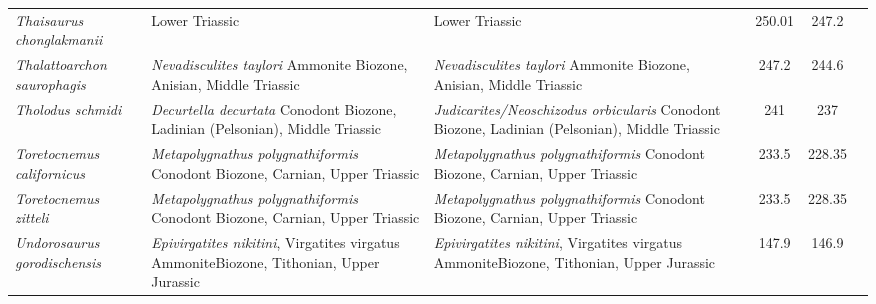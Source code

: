 \begin{longtabu}{>{\itshape}lXXSSl}
	Thaisaurus chonglakmanii                             & Lower Triassic                                                                                                                     & Lower Triassic                                                                                                                     & 250.01                   & 247.2                    & \cite{Mazin1991} \\                      
	Thalattoarchon saurophagis                           & \emph{Nevadisculites taylori} Ammonite Biozone, Anisian, Middle Triassic                                                           & \emph{Nevadisculites taylori} Ammonite Biozone, Anisian, Middle Triassic                                                           & 247.2                    & 244.6                    & \cite{Frobisch2013} \\                   
	Tholodus schmidi                                     & \emph{Decurtella decurtata} Conodont Biozone, Ladinian (Pelsonian), Middle Triassic                                                & \emph{Judicarites/Neoschizodus orbicularis} Conodont Biozone, Ladinian (Pelsonian), Middle Triassic                                & 241                      & 237                      & \cite{DallaVecchia2004} \\               
	Toretocnemus californicus                            & \emph{Metapolygnathus polygnathiformis} Conodont Biozone, Carnian, Upper Triassic                                                  & \emph{Metapolygnathus polygnathiformis} Conodont Biozone, Carnian, Upper Triassic                                                  & 233.5                    & 228.35                   & \cite{Merriam1903,McGowan2003} \\        
	Toretocnemus zitteli                                 & \emph{Metapolygnathus polygnathiformis} Conodont Biozone, Carnian, Upper Triassic                                                  & \emph{Metapolygnathus polygnathiformis} Conodont Biozone, Carnian, Upper Triassic                                                  & 233.5                    & 228.35                   & \cite{Merriam1903,McGowan2003} \\        
	Undorosaurus gorodischensis                          & \emph{Epivirgatites nikitini}, Virgatites virgatus AmmoniteBiozone, Tithonian, Upper Jurassic                                      & \emph{Epivirgatites nikitini}, Virgatites virgatus AmmoniteBiozone, Tithonian, Upper Jurassic                                      & 147.9                    & 146.9                    & \cite{Efimov1999a} \\                    

\end{longtabu}
